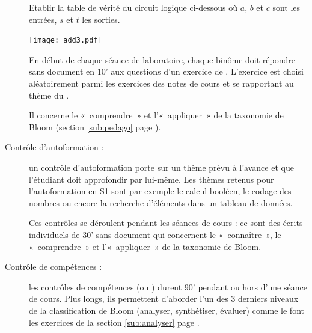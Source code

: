 \begin{description}
{	\begin{td}\label{td:bool}
	Etablir la table de vérité du circuit logique ci-dessous où $a$, $b$
	et $c$ sont les entrées, $s$ et $t$ les sorties.\\[2mm]
	\centerline{\texttt{[image: add3.pdf]}}
	\end{td}}
	En début de chaque séance de 
	laboratoire, chaque binôme doit répondre sans document en 10' aux questions
	d'un exercice de \tdir.
	L'exercice est choisi aléatoirement parmi les exercices 
	des notes de cours et se rapportant au thème du \tdir. 

	Il concerne le «~comprendre~» et l'«~appliquer~» de la taxonomie de Bloom
	(section \ref{sub:pedago} page \pageref{sub:pedago}).
\item[Contrôle d'autoformation :] \mbox{}
	un contrôle d'autoformation porte sur un thème
	prévu à l'avance et que l'étudiant doit approfondir par lui-même. Les thèmes 
	retenus pour l'autoformation en S1 sont par exemple le calcul booléen,
	le codage des nombres ou encore la recherche d'éléments dans un tableau de données.

	Ces contrôles se déroulent pendant les séances de cours : 
	ce sont des écrits individuels de 30' sans document qui concernent
	le «~connaître~», le «~comprendre~» et l'«~appliquer~» de la taxonomie de Bloom.
\item[Contrôle de compétences :] \mbox{}
	les contrôles de compétences (ou \ds) durent 90'
	pendant ou hors d'une séance de cours. Plus longs, ils permettent d'aborder l'un des 3 
	derniers niveaux de la classification de Bloom (analyser, synthétiser, évaluer)
	comme le font les exercices de la section \ref{sub:analyser} page \pageref{sub:analyser}.
\end{description}

